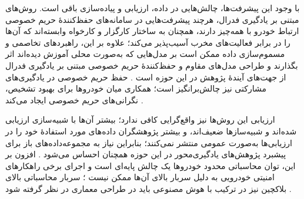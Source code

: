 با وجود این پیشرفت‌ها، چالش‌هایی در داده، ارزیابی و پیاده‌سازی باقی است. روش‌های مبتنی بر یادگیری فدرال، هرچند پیشرفت‌هایی در سامانه‌های حفظ‌کنندهٔ حریم خصوصی ارتباط خودرو با همه‌چیز دارند، همچنان به ساختار کارگزار و کارخواه وابسته‌اند که آن‌ها را در برابر فعالیت‌های مخرب آسیب‌پذیر می‌کند؛ علاوه بر این، راهبردهای تخاصمی و مسموم‌سازی داده ممکن است بر مدل‌هایی که به‌صورت محلی آموزش دیده‌اند اثر بگذارند و طراحی مدل‌های مقاوم و حفظ‌کنندهٔ حریم خصوصی مبتنی بر یادگیری فدرال از جهت‌های آیندهٔ پژوهش در این حوزه است \cite{farsimadanReviewSecurityChallenges2025}. حفظ حریم خصوصی در یادگیری‌های مشارکتی نیز چالش‌برانگیز است؛ همکاری میان خودروها برای بهبود تشخیص، نگرانی‌های حریم خصوصی ایجاد می‌کند \cite{farsimadanReviewSecurityChallenges2025}.

ارزیابی این روش‌ها نیز واقع‌گرایی کافی ندارد؛ بیشتر آن‌ها با شبیه‌سازی ارزیابی شده‌اند و شبیه‌سازها ضعیف‌اند، و بیشتر پژوهشگران داده‌های مورد استفادهٔ خود را در ارزیابی‌ها به‌صورت عمومی منتشر نمی‌کنند؛ بنابراین نیاز به مجموعه‌داده‌های باز برای پیشبرد پژوهش‌های یادگیری‌محور در این حوزه همچنان احساس می‌شود \cite{farsimadanReviewSecurityChallenges2025}. افزون بر این، توان محاسباتی محدود خودروها یک چالش پایه‌ای است و اجرای برخی راهکارهای امنیتی خودرویی به دلیل سربار بالای آن‌ها ممکن نیست \cite{farsimadanReviewSecurityChallenges2025}؛ سربار محاسباتی بالای بلاکچین نیز در ترکیب با هوش مصنوعی باید در طراحی معماری در نظر گرفته شود \cite{hozouriOverviewVANETVehicular2023}.
